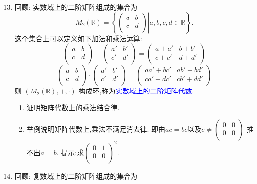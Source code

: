 \documentclass[a4paper,12pt]{article}
\begin{document}
\begin{enumerate}\setcounter{enumi}{12}
    \item 回顾: 实数域上的二阶矩阵组成的集合为
 \[M_2(\mathbb R)=\left\{\left.\begin{pmatrix} a & b \\ c & d\\\end{pmatrix}\right|a,b,c,d\in\mathbb R\right\}.\]
 这个集合上可以定义如下加法和乘法运算:
 \[\begin{pmatrix} a & b \\ c & d\\\end{pmatrix} + \begin{pmatrix} a' & b' \\ c' & d'\\\end{pmatrix} = \begin{pmatrix} a+a' & b+b' \\ c+c' & d+d' \\\end{pmatrix} \]
 \[\begin{pmatrix} a & b \\ c & d\\\end{pmatrix} \cdot \begin{pmatrix} a' & b' \\ c' & d'\\\end{pmatrix} = \begin{pmatrix} aa'+bc' & ab'+bd' \\ ca'+dc' & cb'+dd' \\\end{pmatrix} \]
 则 $(M_2(\mathbb{R}),+,\cdot)$ 构成环,称为\textcolor{blue}{实数域上的二阶矩阵代数}. 
 \begin{enumerate}
 \item 证明矩阵代数上的乘法结合律.
 \item 举例说明矩阵代数上,乘法不满足消去律. 即由$ac=bc$以及$c\neq \begin{pmatrix}0&0\\0&0\\\end{pmatrix}$ 推不出$a=b$. 提示:求$\begin{pmatrix}0&1\\0&0\\\end{pmatrix}^2$.
 \end{enumerate}
\item 回顾: 复数域上的二阶矩阵组成的集合为

\end{enumerate}
\end{document}
